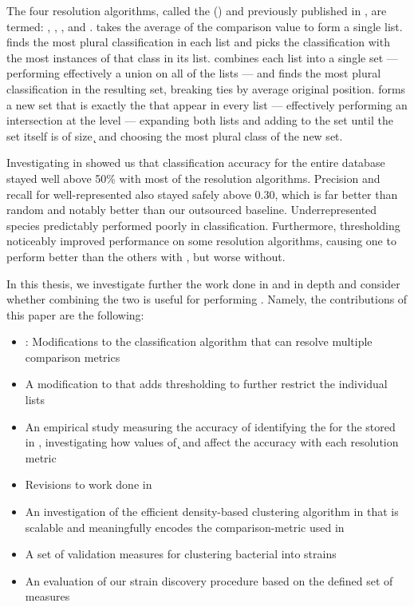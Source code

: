 The four resolution algorithms, called the \krapmed{} (\krap{}) and previously published in \cite{DBLP:conf/bibm/McGovernDKBVG15}, are termed: \rmean{}, \rwinner{}, \runion{}, and \rintersect{}.
\rmean{} takes the average of the comparison value to form a single \kNN{} list.
\rwinner{} finds the most plural classification in each \kNN{} list and picks the classification with the most instances of that class in its list.
\runion{} combines each \kNN{} list into a single set --- performing effectively a union on all of the \kNN{} lists --- and finds the most plural classification in the resulting set, breaking ties by average original position.
\rintersect{} forms a new set that is exactly the \isols{} that appear in every \kNN{} list --- effectively performing an intersection at the \isol{} level --- expanding both lists and adding to the set until the set itself is of size \k{} and choosing the most plural class of the new set.

Investigating \krap{} in \cite{DBLP:conf/bibm/McGovernDKBVG15} showed us that classification accuracy for the entire database stayed well above 50\% with most of the resolution algorithms.
Precision and recall for well-represented \spec{} also stayed safely above 0.30, which is far better than random and notably better than our outsourced baseline.
Underrepresented species predictably performed poorly in classification.
Furthermore, \a{} thresholding noticeably improved performance on some resolution algorithms, causing one to perform better than the others with \a{}, but worse without.



In this thesis, we investigate further the work done in \cite{DBLP:conf/bibm/McGovernDKBVG15} and \cite{DBLP:conf/bcb/McGovernJDBKV16} in depth and consider whether combining the two is useful for performing \mst{}.
Namely, the contributions of this paper are the following:
\begin{itemize}
    \item \krapmed{}: Modifications to the \kNN{} classification algorithm that can resolve multiple comparison metrics
    \item A modification to \kNN{} that adds \a{} thresholding to further restrict the individual \kNN{} lists
    \item An empirical study measuring the accuracy of identifying the \spec{} for the \ecoli{} \isols{} stored in \cplop{}, investigating how values of \k{} and \a{} affect the accuracy with each resolution metric
    \item Revisions to work done in \cite{DBLP:conf/bibm/McGovernDKBVG15}
    \item An investigation of the efficient density-based clustering algorithm in \cite{johnson2015density} that is scalable and meaningfully encodes the comparison-metric used in \cplop{}
    \item A set of validation measures for clustering bacterial \isols{} into strains
    \item An evaluation of our strain discovery procedure based on the defined set of measures
\end{itemize}


